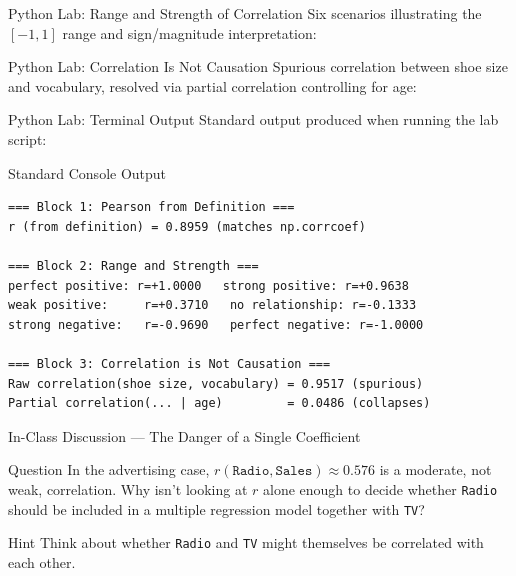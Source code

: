 \documentclass[10pt, aspectratio=169]{beamer}
\begin{document}
\begin{frame}[fragile]{Python Lab: Range and Strength of Correlation}
  \scriptsize
  Six scenarios illustrating the $[-1,1]$ range and sign/magnitude interpretation:
  {
  }
\end{frame}

\begin{frame}[fragile]{Python Lab: Correlation Is Not Causation}
  \scriptsize
  Spurious correlation between shoe size and vocabulary, resolved via partial correlation controlling for age:
  {
  }
\end{frame}

\begin{frame}[fragile]{Python Lab: Terminal Output}
  \scriptsize
  Standard output produced when running the lab script:
  \vspace{0.02cm}
  \begin{block}{Standard Console Output}
    \fontsize{3.8pt}{4.6pt}\selectfont
    \begin{verbatim}
=== Block 1: Pearson from Definition ===
r (from definition) = 0.8959 (matches np.corrcoef)

=== Block 2: Range and Strength ===
perfect positive: r=+1.0000   strong positive: r=+0.9638
weak positive:     r=+0.3710   no relationship: r=-0.1333
strong negative:   r=-0.9690   perfect negative: r=-1.0000

=== Block 3: Correlation is Not Causation ===
Raw correlation(shoe size, vocabulary) = 0.9517 (spurious)
Partial correlation(... | age)         = 0.0486 (collapses)
    \end{verbatim}
  \end{block}
\end{frame}

\begin{frame}{In-Class Discussion --- The Danger of a Single Coefficient}
  \footnotesize
  \begin{block}{Question}
    In the advertising case, $r(\texttt{Radio},\texttt{Sales})\approx0.576$ is a moderate, not weak, correlation. Why isn't looking at $r$ alone enough to decide whether \texttt{Radio} should be included in a multiple regression model together with \texttt{TV}?
  \end{block}

  \vspace{0.15cm}
  \pause
  \begin{alertblock}{Hint}
    Think about whether \texttt{Radio} and \texttt{TV} might themselves be correlated with each other.
  \end{alertblock}
\end{frame}
\end{document}
